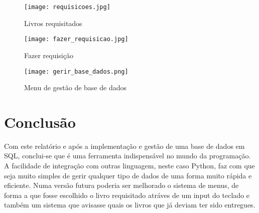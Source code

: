 \documentclass[11pt,openright,oneside]{report}
\begin{document}
\begin{figure}[!h]
\centering
\texttt{[image: requisicoes.jpg]}
\caption{Livros requisitados}
\end{figure}

\begin{figure}[!h]
\centering
\texttt{[image: fazer\_requisicao.jpg]}
\caption{Fazer requisição}
\end{figure}

\begin{figure}[!h]
\centering
\texttt{[image: gerir\_base\_dados.png]}
\caption{Menu de gestão de base de dados}
\end{figure}

\chapter{Conclusão}
\label{chap.conclusao}

Com este relatório e após a implementação e gestão de uma base de dados em SQL, conclui-se que é uma ferramenta indispensável no mundo da programação.
A facilidade de integração com outras linguagem, neste caso Python, faz com que seja muito simples de gerir qualquer tipo de dados de uma forma muito rápida e eficiente.
Numa versão futura poderia ser melhorado o sistema de menus, de forma a que fosse escolhido o livro requisitado atráves de um input do teclado e também um sistema que avisasse quais os livros que já deviam ter sido entregues.

\nocite{*}



\end{document}
